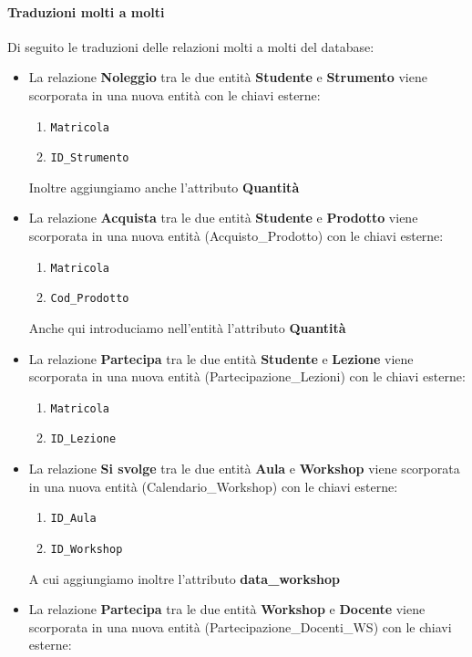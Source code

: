 \paragraph{Traduzioni molti a molti} Di seguito le traduzioni delle relazioni molti a molti del database: 
\begin{itemize}
    \item La relazione \textbf{Noleggio} tra le due entità \textbf{Studente} e \textbf{Strumento} viene scorporata in una nuova entità con le chiavi esterne: 
    \begin{enumerate}
        \item \texttt{Matricola}
        \item \texttt{ID\_Strumento}
    \end{enumerate}
    Inoltre aggiungiamo anche l'attributo \textbf{Quantità}
    \item La relazione \textbf{Acquista} tra le due entità \textbf{Studente} e \textbf{Prodotto} viene scorporata in una nuova entità (Acquisto\_Prodotto) con le chiavi esterne: 
    \begin{enumerate}
        \item \texttt{Matricola}
        \item \texttt{Cod\_Prodotto}
    \end{enumerate}
    Anche qui introduciamo nell'entità l'attributo \textbf{Quantità}
    \item La relazione \textbf{Partecipa} tra le due entità \textbf{Studente} e \textbf{Lezione} viene scorporata in una nuova entità (Partecipazione\_Lezioni) con le chiavi esterne: 
    \begin{enumerate}
        \item \texttt{Matricola}
        \item \texttt{ID\_Lezione}
    \end{enumerate}
    \item La relazione \textbf{Si svolge} tra le due entità \textbf{Aula} e \textbf{Workshop} viene scorporata in una nuova entità (Calendario\_Workshop) con le chiavi esterne: 
    \begin{enumerate}
        \item \texttt{ID\_Aula} 
        \item \texttt{ID\_Workshop}
    \end{enumerate}
    A cui aggiungiamo inoltre l'attributo \textbf{data\_workshop}
    \newpage
    \item La relazione \textbf{Partecipa} tra le due entità \textbf{Workshop} e \textbf{Docente} viene scorporata in una nuova entità (Partecipazione\_Docenti\_WS) con le chiavi esterne: 

\end{itemize}
